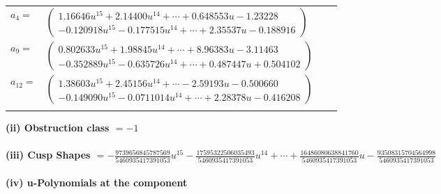 \documentclass[1p]{elsarticle_modified}
\theoremstyle{definition}
\begin{document}
\begin{tabular}{m{7pt} m{180pt} m{7pt} m{180pt} }
\flushright $a_{4}=$&$\begin{pmatrix}1.16646 u^{15}+2.14400 u^{14}+\cdots+0.648553 u-1.23228\\-0.120918 u^{15}-0.177515 u^{14}+\cdots+2.35537 u-0.188916\end{pmatrix}$ \\
\flushright $a_{9}=$&$\begin{pmatrix}0.802633 u^{15}+1.98845 u^{14}+\cdots+8.96383 u-3.11463\\-0.352889 u^{15}-0.635726 u^{14}+\cdots+0.487447 u+0.504102\end{pmatrix}$ \\
\flushright $a_{12}=$&$\begin{pmatrix}1.38603 u^{15}+2.45156 u^{14}+\cdots-2.59193 u-0.500660\\-0.149090 u^{15}-0.0711014 u^{14}+\cdots+2.28378 u-0.416208\end{pmatrix}$\\&\end{tabular}
\flushleft \textbf{(ii) Obstruction class $= -1$}\\~\\
\flushleft \textbf{(iii) Cusp Shapes $= -\frac{9739656845787569}{5460935417391053} u^{15}-\frac{17595322506035493}{5460935417391053} u^{14}+\cdots+\frac{16486080638841760}{5460935417391053} u-\frac{93508315704564998}{5460935417391053}$}\\~\\
\newpage\renewcommand{\arraystretch}{1}
\flushleft \textbf{(iv) u-Polynomials at the component}\newline \\
\end{document}
